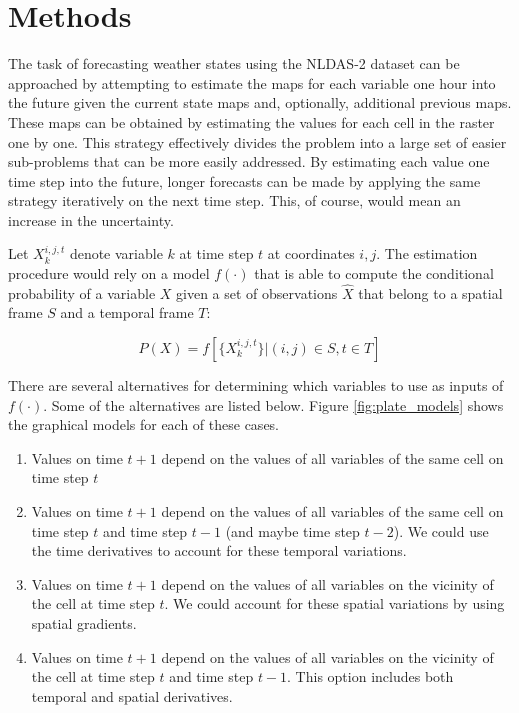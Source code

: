 \documentclass{article}
\begin{document}
\section{Methods}

The task of forecasting weather states using the NLDAS-2 dataset can be
approached by attempting to estimate the maps for each variable one hour into
the future given the current state maps and, optionally, additional previous
maps. These maps can be obtained by estimating the values for each cell in the
raster one by one. This strategy effectively divides the problem into a
large set of easier sub-problems that can be more easily addressed. By
estimating each value one time step into the future, longer forecasts can be
made by applying the same strategy iteratively on the next time step. This, of
course, would mean an increase in the uncertainty.

Let $X_k^{i,j,t}$ denote variable $k$ at time step $t$ at coordinates $i, j$.
The estimation procedure would rely on a model $f(\cdot)$ that is able to
compute the conditional probability of a variable $X$ given a set of observations
$\hat{X}$ that belong to a spatial frame $S$ and a temporal frame $T$:

\begin{equation}
\label{eq:condProb}
P(X) = f[\{X_k^{i,j,t}\} | (i,j) \in S, t \in T]
\end{equation}

There are several alternatives for determining which variables to use as inputs
of $f(\cdot)$. Some of the alternatives are listed below. Figure
\ref{fig:plate_models} shows the graphical models for each of these cases.

\begin{enumerate}
\item Values on time $t + 1$ depend on the values of all variables of the same
cell on time step $t$
\item Values on time $t + 1$ depend on the values of all variables of the same
cell on time step $t$ and time step $t - 1$ (and maybe time step $t- 2$). We
could use the time derivatives to account for these temporal variations.
\item Values on time $t + 1$ depend on the values of all variables on the
vicinity of the cell at time step $t$. We could account for these spatial
variations by using spatial gradients.
\item Values on time $t + 1$ depend on the values of all variables on the
vicinity of the cell at time step $t$ and time step $t -1$. This option includes
both temporal and spatial derivatives.
\end{enumerate}
\end{document}

